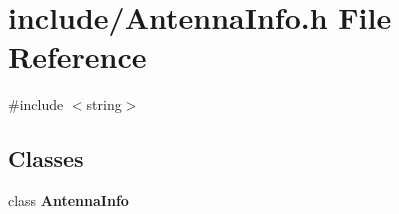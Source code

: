 \section{include/\+Antenna\+Info.h File Reference}
\label{_antenna_info_8h}
{\ttfamily \#include $<$string$>$}\newline
\subsection*{Classes}
\begin{DoxyCompactItemize}
\item 
class \textbf{ Antenna\+Info}
\end{DoxyCompactItemize}
